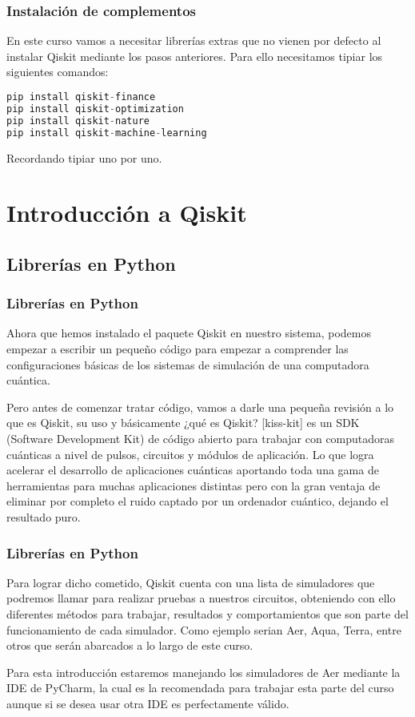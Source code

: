 \documentclass[spanish]{beamer}
\begin{document}
\begin{frame}[fragile]\frametitle{Instalación de complementos}
\justify\setlength{\parskip}{5mm}
En este curso vamos a necesitar librerías extras que no vienen por defecto al instalar Qiskit mediante los pasos anteriores. Para ello necesitamos tipiar los siguientes comandos:
\begin{lstlisting}[language=c++]
pip install qiskit-finance
pip install qiskit-optimization
pip install qiskit-nature
pip install qiskit-machine-learning\end{lstlisting}
Recordando tipiar uno por uno.
\end{frame}
\section{Introducción a Qiskit}\subsection{Librerías en Python}
\justify\setlength{\parskip}{5mm}
\begin{frame}\frametitle{Librerías en Python} 

Ahora que hemos instalado el paquete Qiskit en nuestro sistema, podemos empezar a escribir un pequeño código para empezar a comprender las configuraciones básicas de los sistemas de simulación de una computadora cuántica.

Pero antes de comenzar tratar código, vamos a darle una pequeña revisión a lo que es Qiskit, su uso y básicamente ¿qué es Qiskit? [kiss-kit] es un SDK (Software Development Kit) de código abierto para trabajar con computadoras cuánticas a nivel de pulsos, circuitos y módulos de aplicación. Lo que logra acelerar el desarrollo de aplicaciones cuánticas aportando toda una gama de herramientas para muchas aplicaciones distintas pero con la gran ventaja de eliminar por completo el ruido captado por un ordenador cuántico, dejando el resultado puro.

\end{frame} 
\begin{frame}
\frametitle{Librerías en Python} 
Para lograr dicho cometido, Qiskit cuenta con una lista de simuladores que podremos llamar para realizar pruebas a nuestros circuitos, obteniendo con ello diferentes métodos para trabajar, resultados y comportamientos que son parte del funcionamiento de cada simulador. Como ejemplo serian Aer, Aqua, Terra, entre otros que serán abarcados a lo largo de este curso.

Para esta introducción estaremos manejando los simuladores de Aer mediante la IDE de PyCharm, la cual es la recomendada para trabajar esta parte del curso aunque si se desea usar otra IDE es perfectamente válido.

\end{frame} 
\end{document}
